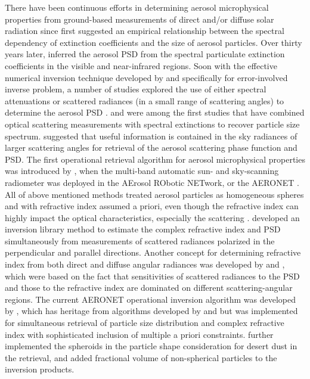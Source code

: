 There have been continuous efforts in determining aerosol microphysical
properties from ground-based measurements of direct and/or diffuse solar
radiation since \citet{Angstrom29} first suggested an empirical relationship
between the spectral dependency of extinction coefficients and the size of
aerosol particles. Over thirty years later, \citet{Curcio61} inferred the aerosol
PSD from the spectral particulate extinction coefficients in the visible and
near-infrared regions. Soon with the effective numerical inversion technique
developed by \citet{Phillips62} and \citet{Twomey63} specifically for 
error-involved inverse problem, a number of studies explored the use of either spectral
attenuations or scattered radiances (in a small range of scattering angles) to
determine the aerosol PSD
\citep{Twomey67,Yamamoto69,Dave71,Grassl71,Herman71,King78}.
\citet{Shaw79} and \citet{Nakajima83} were among the first studies that have combined
optical scattering measurements with spectral extinctions to recover particle
size spectrum. \citet{Kaufman94} suggested that useful information is contained
in the sky radiances of larger scattering angles for retrieval of the aerosol
scattering phase function and PSD. The first operational retrieval algorithm
for aerosol microphysical properties was introduced by \citet{Nakajima96},
when the multi-band automatic sun- and sky-scanning radiometer was deployed in
the AErosol RObotic NETwork, or the AERONET \citep{Holben98}. All of
above mentioned methods treated aerosol particles as homogeneous spheres and
with refractive index assumed a priori, even though the refractive index can
highly impact the optical characteristics, especially the scattering 
\citep{Hansen74}. \citet{Tanaka82,Tanaka83} developed an inversion library
method to estimate the complex refractive index and PSD simultaneously from
measurements of scattered radiances polarized in the perpendicular and parallel
directions. Another concept for determining refractive index from both direct
and diffuse angular radiances was developed by \citet{Wendisch94} and 
\citet{Yamasoe98}, which were based on the fact that
sensitivities of scattered radiances to the PSD and those to the refractive
index are dominated on different scattering-angular regions. The current
AERONET operational inversion algorithm was developed by \citet{Dubovik00a},
which has heritage from algorithms developed by \citet{King78} and
\citet{Nakajima83,Nakajima96} but was implemented for simultaneous retrieval of
particle size distribution and complex refractive index with sophisticated
inclusion of multiple a priori constraints. \citet{Dubovik02,Dubovik06} further
implemented the spheroids in the particle shape consideration for desert dust
in the retrieval, and added fractional volume of non-spherical particles to the
inversion products.

